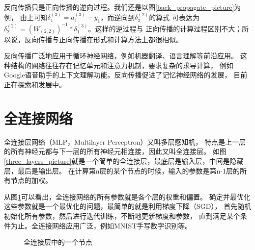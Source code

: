 反向传播只是正向传播的逆向过程。我们还是以图\ref{back_propagate_picture}为例，
由上可知$\delta_{1}^{(3)}=a_{1}^{(3)}-y_{1}$，而逆向到$\delta_{2}^{(2)}$的算式
可表达为$\delta_{2}^{(2)}=(W_{(2,2)})^{-1}*\delta_{1}^{(3)}$。这样的逆过程与
正向传播的计算过程区别不大；所以说，反向传播与正向传播在形式和计算方法上都很相似。

反向传播广泛地应用于循环神经网络，例如机器翻译、语言理解等前沿应用。
这种结构的网络往往存在记忆单元和注意力机制，要求复杂的求导计算，
例如Google语音助手的上下文理解功能。反向传播促进了记忆神经网络的发展，
目前正在探索和发展中。



\section{全连接网络}
全连接层网络（MLP，Multilayer Perceptron）又叫多层感知机，
特点是上一层的所有神经元都与下一层的所有神经元相连接，因此又叫全连接层。
如图\ref{three_layers_picture}就是一个简单的全连接层，最底层是输入层，中间是隐藏层，最后是输出层。
在计算第n层的某个节点的时候，输入的参数是第n-1层的所有节点的加权。

从图\ref{multilayer_perceptron}可以看出，全连接网络的所有参数就是各个层的权重和偏置。
确定并最优化这些参数就是一个最优化的问题，最简单的就是利用梯度下降（SGD），
首先随机初始化所有参数，然后进行迭代训练，不断地更新梯度和参数，
直到满足某个条件为止。全连接网络应用广泛，例如MNIST手写数字识别等。

\begin{figure}[!ht]
    \begin{center}
    \caption{全连接层中的一个节点}
    \label{multilayer_perceptron}
    \end{center}
\end{figure}



